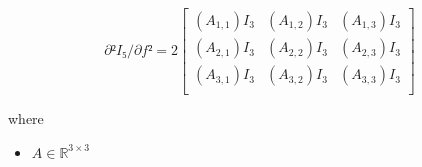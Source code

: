 \documentclass[12pt]{article}
\begin{document}
\[
\textit{∂²I₅/∂f²} = 2\begin{bmatrix}
(\textit{A}_{1, 1})I_{ 3 } & (\textit{A}_{1, 2})I_{ 3 } & (\textit{A}_{1, 3})I_{ 3 }\\
(\textit{A}_{2, 1})I_{ 3 } & (\textit{A}_{2, 2})I_{ 3 } & (\textit{A}_{2, 3})I_{ 3 }\\
(\textit{A}_{3, 1})I_{ 3 } & (\textit{A}_{3, 2})I_{ 3 } & (\textit{A}_{3, 3})I_{ 3 }\\
\end{bmatrix}
\]

where
\begin{itemize}
\item $\textit{A} \in \mathbb{R}^{ 3 \times 3 }$
\end{itemize}
\end{document}
